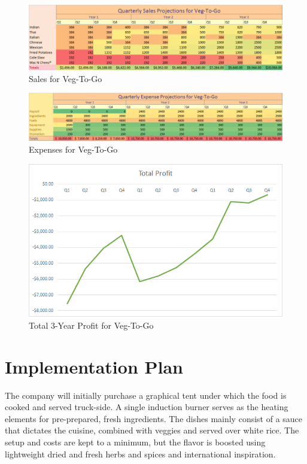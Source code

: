 \documentclass[12pt, letterpaper]{article}
\newcommand{\companyname}{Veg-To-Go}
\begin{document}
\begin{figure}[H]
	\label{products}
	\caption{Sales for \companyname{}}
	\includegraphics[width=\textwidth]{SalesNumbers}
\end{figure}

\begin{figure}[H]
	\caption{Expenses for \companyname{}}
	\includegraphics[width=\textwidth]{ExpensesNumbers}
\end{figure}

\begin{figure}[H]
	\caption{Total 3-Year Profit for \companyname{}}
	\includegraphics[width=\textwidth]{TotalProfit}
\end{figure}

\section{Implementation Plan}
The company will initially purchase a graphical tent under which the food is cooked and served truck-side.  A single induction burner serves as the heating elements for pre-prepared, fresh ingredients.  The dishes mainly consist of a sauce that dictates the cuisine, combined with veggies and served over white rice.  The setup and costs are kept to a minimum, but the flavor is boosted using lightweight dried and fresh herbs and spices and international inspiration.
\end{document}
